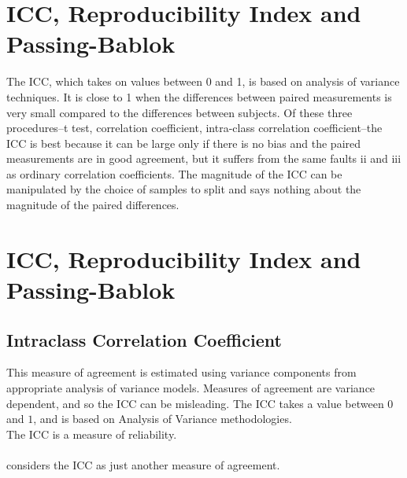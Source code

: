 \documentclass[MAIN.tex]{subfiles}
\begin{document}
\section{ICC, Reproducibility Index and Passing-Bablok }
	
The ICC, which takes on values between 0 and 1, is based on analysis of variance techniques. It is close to 1 when the differences between paired measurements is very small compared to the differences between subjects. Of these three procedures--t test, correlation coefficient, intra-class correlation coefficient--the ICC is best because it can be large only if there is no bias and the paired measurements are in good agreement, but it suffers from the same faults ii and iii as ordinary correlation coefficients. The magnitude of the ICC can be manipulated by the choice of samples to split and says nothing about the magnitude of the paired differences.
	

\section{ICC, Reproducibility Index and Passing-Bablok }


\subsection{Intraclass Correlation Coefficient} This measure of agreement is estimated using variance components from appropriate analysis of variance models. Measures of agreement are variance dependent, and so the ICC can be misleading. The ICC takes a value between $0$ and $1$, and is based on Analysis of Variance
methodologies.
\\
The ICC is a measure of reliability.
\\
\\\citet{bartko} considers the ICC as just another measure of agreement.






\end{document}
